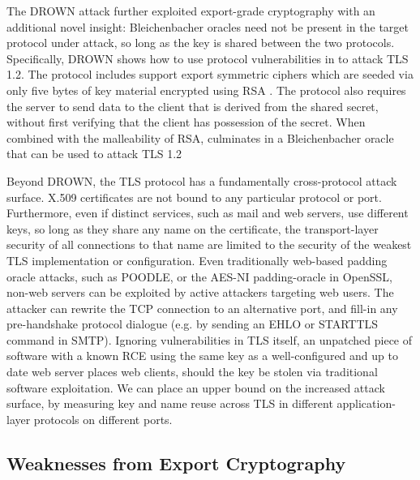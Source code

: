 The DROWN attack further exploited export-grade cryptography with an additional
novel insight: Bleichenbacher oracles need not be present in the target
protocol under attack, so long as the key is shared between the two protocols.
Specifically, DROWN shows how to use protocol vulnerabilities in \ssltwo to
attack TLS 1.2. The \ssltwo protocol includes support export symmetric ciphers
which are seeded via only five bytes of key material encrypted using RSA \PKCS.
The \ssltwo protocol also requires the server to send data to the client that is
derived from the shared secret, without first verifying that the client has
possession of the secret. When combined with the malleability of RSA,
culminates in a Bleichenbacher oracle that can be used to attack TLS 1.2

Beyond DROWN, the TLS protocol has a fundamentally cross-protocol attack
surface. X.509 certificates are not bound to any particular protocol or port.
Furthermore, even if distinct services, such as mail and web servers, use
different keys, so long as they share any name on the certificate, the
transport-layer security of all connections to that name are limited to the
security of the weakest TLS implementation or configuration. Even traditionally
web-based padding oracle attacks, such as POODLE, or the AES-NI padding-oracle
in OpenSSL, non-web servers can be exploited by active attackers targeting web
users. The attacker can rewrite the TCP connection to an alternative port, and
fill-in any pre-handshake protocol dialogue (e.g. by sending an EHLO or
STARTTLS command in SMTP). Ignoring vulnerabilities in TLS itself, an unpatched
piece of software with a known RCE using the same key as a well-configured and
up to date web server places web clients, should the key be stolen via
traditional software exploitation. We can place an upper bound on the increased
attack surface, by measuring key and name reuse across TLS in different
application-layer protocols on different ports.

\subsection{Weaknesses from Export Cryptography}

